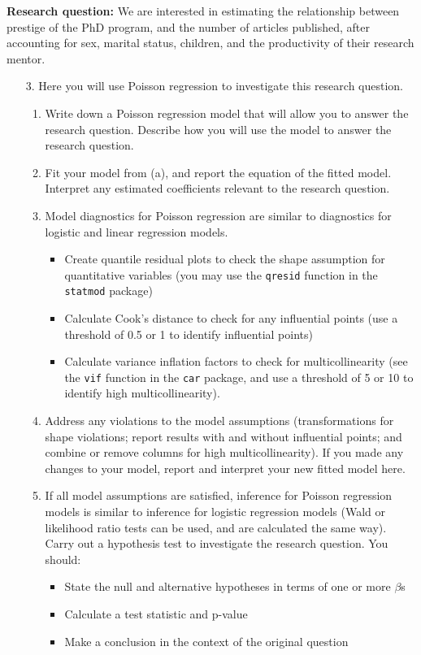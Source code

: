 \documentclass[11pt]{article}
\begin{document}
\noindent \textbf{Research question:} We are interested in estimating the relationship between prestige of the PhD program, and the number of articles published, after accounting for sex, marital status, children, and the productivity of their research mentor.

\begin{enumerate}
\item[3.] Here you will use Poisson regression to investigate this research question.

\begin{enumerate}
\item Write down a Poisson regression model that will allow you to answer the research question. Describe how you will use the model to answer the research question.
\item Fit your model from (a), and report the equation of the fitted model. Interpret any estimated coefficients relevant to the research question.
\item Model diagnostics for Poisson regression are similar to diagnostics for logistic and linear regression models.
\begin{itemize}
\item Create quantile residual plots to check the shape assumption for quantitative variables (you may use the \texttt{qresid} function in the \texttt{statmod} package)
\item Calculate Cook's distance to check for any influential points (use a threshold of 0.5 or 1 to identify influential points)
\item Calculate variance inflation factors to check for multicollinearity (see the \texttt{vif} function in the \texttt{car} package, and use a threshold of 5 or 10 to identify high multicollinearity). 
\end{itemize}
\item Address any violations to the model assumptions (transformations for shape violations; report results with and without influential points; and combine or remove columns for high multicollinearity). If you made any changes to your model, report and interpret your new fitted model here.
\item If all model assumptions are satisfied, inference for Poisson regression models is similar to inference for logistic regression models (Wald or likelihood ratio tests can be used, and are calculated the same way). Carry out a hypothesis test to investigate the research question. You should:
\begin{itemize}
\item State the null and alternative hypotheses in terms of one or more $\beta$s
\item Calculate a test statistic and p-value
\item Make a conclusion in the context of the original question
\end{itemize}
\end{enumerate} 
\end{enumerate}
\end{document}
